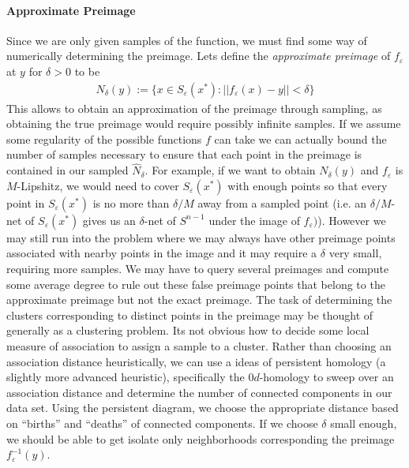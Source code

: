 \documentclass[12pt]{article}
\begin{document}
\paragraph{Approximate Preimage}
Since we are only given samples of the function, we must find some way of numerically determining the preimage. Lets define the \textit{approximate preimage} of $f_{\varepsilon}$ at $y$ for $\delta>0$ to be
\begin{align}
N_{\delta}(y) := \{x\in S_{\varepsilon}(x^*) : ||f_{\varepsilon}(x) - y || < \delta \}
\end{align}
This allows to obtain an approximation of the preimage through sampling, as obtaining the true preimage would require possibly infinite samples. If we assume some regularity of the possible functions $f$ can take we can actually bound the number of samples necessary to ensure that each point in the preimage is contained in our sampled $\widehat{N}_{\delta}$. For example, if we want to obtain $N_{\delta}(y)$ and $f_{\varepsilon}$ is $M$-Lipshitz, we would need to cover $S_{\varepsilon}(x^*)$ with enough points so that every point in $S_{\varepsilon}(x^*)$ is no more than $\delta/M$ away from a sampled point (i.e. an $\delta/M$-net of $S_{\varepsilon}(x^*)$ gives us an $\delta$-net of $S^{n-1}$ under the image of $f_{\varepsilon})$). However we may still run into the problem where we may always have other preimage points associated with nearby points in the image and it may require a $\delta$ very small, requiring more samples. We may have to query several preimages and compute some average degree to rule out these false preimage points that belong to the approximate preimage but not the exact preimage.
The task of determining the clusters corresponding to distinct points in the preimage may be thought of generally as a clustering problem. Its not obvious how to decide some local measure of association to assign a sample to a cluster. Rather than choosing an association distance heuristically, we can use a ideas of persistent homology (a slightly more advanced heuristic), specifically the $0d$-homology to sweep over an association distance and determine the number of connected components in our data set. Using the persistent diagram, we choose the appropriate distance based on ``births'' and ``deaths'' of connected components. If we choose $\delta$ small enough, we should be able to get isolate only neighborhoods corresponding the preimage $f_{\varepsilon}^{-1}(y)$.
\end{document}
